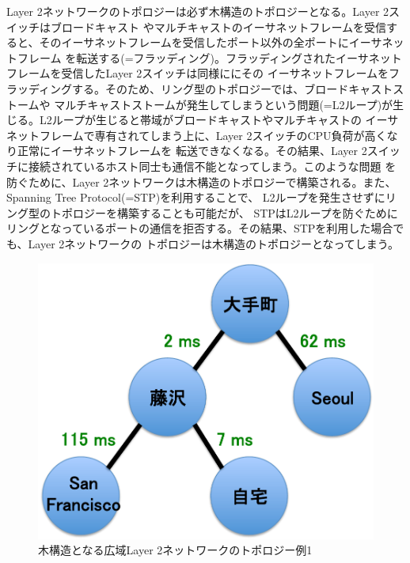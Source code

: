 Layer 2ネットワークのトポロジーは必ず木構造のトポロジーとなる。Layer 2スイッチはブロードキャスト
やマルチキャストのイーサネットフレームを受信すると、そのイーサネットフレームを受信したポート以外の全ポートにイーサネットフレーム
を転送する(=フラッディング)。フラッディングされたイーサネットフレームを受信したLayer 2スイッチは同様ににその
イーサネットフレームをフラッディングする。そのため、リング型のトポロジーでは、ブロードキャストストームや
マルチキャストストームが発生してしまうという問題(=L2ループ)が生じる。L2ループが生じると帯域がブロードキャストやマルチキャストの
イーサネットフレームで専有されてしまう上に、Layer 2スイッチのCPU負荷が高くなり正常にイーサネットフレームを
転送できなくなる。その結果、Layer 2スイッチに接続されているホスト同士も通信不能となってしまう。このような問題
を防ぐために、Layer 2ネットワークは木構造のトポロジーで構築される。また、Spanning Tree Protocol(=STP)を利用することで、
L2ループを発生させずにリング型のトポロジーを構築することも可能だが、
STPはL2ループを防ぐためにリングとなっているポートの通信を拒否する。その結果、STPを利用した場合でも、Layer 2ネットワークの
トポロジーは木構造のトポロジーとなってしまう。

\begin{figure}
	\begin{center}
		\includegraphics[scale=0.50]{./img/highlatencyl2}
		\caption{木構造となる広域Layer 2ネットワークのトポロジー例1}
		\label{img:highlatencyl2}
	\end{center}
\end{figure}

